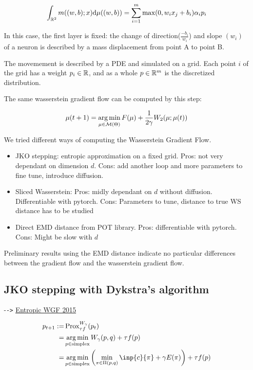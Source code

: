\begin{equation}
	\int_{\mathbb{R}^2} m((w, b); x) \mathrm{d} \mu((w, b)) = \sum_{i=1}^{m} \max(0, w_i x_j + b_i) \alpha_i p_i
\end{equation}

In this case, the first layer is fixed: the change of direction($\frac{-b_i}{w_i}$) and slope $(w_i)$ of a neuron is described by a mass displacement from point A to point B. 

The movemement is described by a PDE and simulated on a grid. Each point $i$ of the grid has a weight $p_i \in \mathbb{R}$, and as a whole $p \in \mathbb{R}^m$ is the discretized distribution.

The same wasserstein gradient flow can be computed by this step:

\begin{equation}
	\mu(t+1) = \operatorname*{arg\,min}_{\mu \in \mathcal{M}(\Theta)} F(\mu) + \frac{1}{2 \gamma} W_2(\mu; \mu(t))
\end{equation}

We tried different ways of computing the Wasserstein Gradient Flow. 

\begin{itemize}
	\item JKO stepping: entropic approximation on a fixed grid. Pros: not very dependant on dimension $d$. Cons: add another loop and more parameters to fine tune, introduce diffusion.
		\item Sliced Wasserstein: Pros: midly dependant on $d$ without diffusion. Differentiable with pytorch. Cons: Parameters to tune, distance to true WS distance has to be studied
		\item Direct EMD distance from POT library. Pros: differentiable with pytorch. Cons: Might be slow with $d$
\end{itemize}

Preliminary results using the EMD distance indicate no particular differences between the gradient flow and the wasserstein gradient flow.

\subsection{JKO stepping with Dykstra's algorithm}

-\verb|->| \href{https://arxiv.org/pdf/1502.06216.pdf}{Entropic WGF 2015}

\begin{align}
p_{t+1} := & \prox^{W_{\gamma}}_{\tau f}(p_t) \\
							= & \argmin_{p \in \text{simplex}} W_{\gamma}(p, q) + \tau f(p) \\
							= &\argmin_{p \in \text{simplex}}  \left( \min_{\pi \in \Pi(p, q)} \inp{c}{\pi} + \gamma E(\pi) \right) + \tau f(p)
\end{align}

